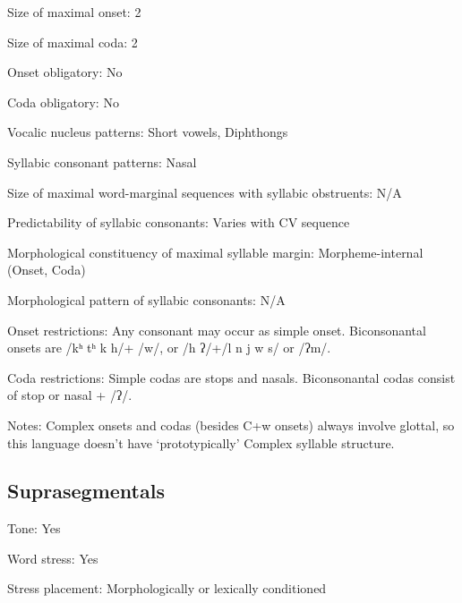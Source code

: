 {\begin{appendixdesc}
\item[Size of maximal onset:] 2

\item[Size of maximal coda:] 2

\item[Onset obligatory:] No

\item[Coda obligatory:] No

\item[Vocalic nucleus patterns:] Short vowels, Diphthongs

\item[Syllabic consonant patterns:] Nasal

\item[Size of maximal word-marginal sequences with syllabic obstruents:] N/A

\item[Predictability of syllabic consonants:] Varies with CV sequence

\item[Morphological constituency of maximal syllable margin:] Morpheme-internal (Onset, Coda)

\item[Morphological pattern of syllabic consonants:] N/A

\item[Onset restrictions:] Any consonant may occur as simple onset. Biconsonantal onsets are /kʰ tʰ k h/+ /w/, or /h ʔ/+/l n j w s/ or /ʔm/.

\item[Coda restrictions:] Simple codas are stops and nasals. Biconsonantal codas consist of stop or nasal + /ʔ/.

\item[Notes:] Complex onsets and codas (besides C+w onsets) always involve glottal, so this language doesn’t have ‘prototypically’ Complex syllable structure.
\end{appendixdesc}
\subsection*{Suprasegmentals}
\begin{appendixdesc}
\item[Tone:] Yes

\item[Word stress:] Yes

\item[Stress placement:] Morphologically or lexically conditioned


\end{appendixdesc}}
